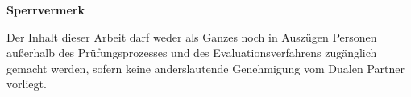 \thispagestyle{empty}


\begin{center}
\huge{\textbf{Sperrvermerk}}
\par
\vspace{2cm}
\end{center}

Der Inhalt dieser Arbeit darf weder als Ganzes noch in Auszügen Personen außerhalb des Prüfungsprozesses und des Evaluationsverfahrens zugänglich gemacht werden, sofern keine anderslautende Genehmigung vom Dualen Partner vorliegt.

\Unterschrift
\clearpage
